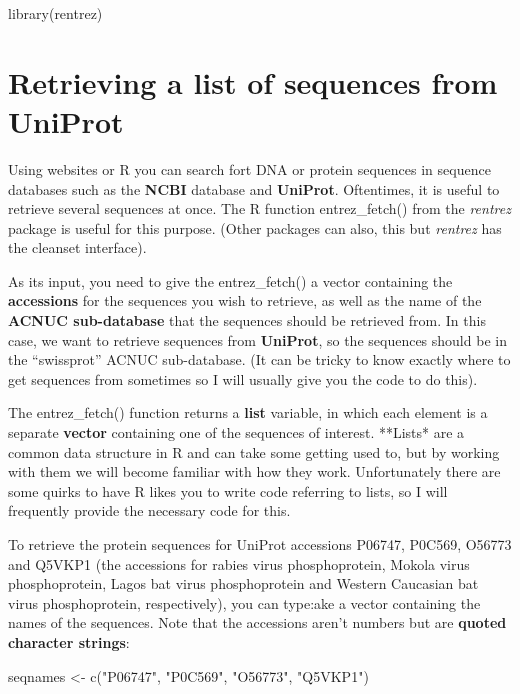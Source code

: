 \documentclass[
]{book}
\newenvironment{Shaded}{\begin{snugshade}}{\end{snugshade}}
\newcommand{\FunctionTok}[1]{\textcolor[rgb]{0.00,0.00,0.00}{#1}}
\newcommand{\NormalTok}[1]{#1}
\newcommand{\OtherTok}[1]{\textcolor[rgb]{0.56,0.35,0.01}{#1}}
\newcommand{\StringTok}[1]{\textcolor[rgb]{0.31,0.60,0.02}{#1}}
\begin{document}
\begin{Shaded}
\begin{Highlighting}[]
\FunctionTok{library}\NormalTok{(rentrez)}
\end{Highlighting}
\end{Shaded}

\hypertarget{retrieving-a-list-of-sequences-from-uniprot}{%
\section{Retrieving a list of sequences from UniProt}\label{retrieving-a-list-of-sequences-from-uniprot}}

Using websites or R you can search fort DNA or protein sequences in sequence databases such as the \textbf{NCBI} database and \textbf{UniProt}. Oftentimes, it is useful to retrieve several sequences at once. The R function entrez\_fetch() from the \emph{rentrez} package is useful for this purpose. (Other packages can also, this but \emph{rentrez} has the cleanset interface).

As its input, you need to give the entrez\_fetch() a vector containing the \textbf{accessions} for the sequences you wish to retrieve, as well as the name of the \textbf{ACNUC sub-database} that the sequences should be retrieved from. In this case, we want to retrieve sequences from \textbf{UniProt}, so the sequences should be in the ``swissprot'' ACNUC sub-database. (It can be tricky to know exactly where to get sequences from sometimes so I will usually give you the code to do this).

The entrez\_fetch() function returns a \textbf{list} variable, in which each element is a separate \textbf{vector} containing one of the sequences of interest. **Lists* are a common data structure in R and can take some getting used to, but by working with them we will become familiar with how they work. Unfortunately there are some quirks to have R likes you to write code referring to lists, so I will frequently provide the necessary code for this.

To retrieve the protein sequences for UniProt accessions P06747, P0C569, O56773 and Q5VKP1 (the accessions for rabies virus phosphoprotein, Mokola virus phosphoprotein, Lagos bat virus phosphoprotein and Western Caucasian bat virus phosphoprotein, respectively), you can type:ake a vector containing the names of the sequences. Note that the accessions aren't numbers but are \textbf{quoted character strings}:

\begin{Shaded}
\begin{Highlighting}[]
\NormalTok{seqnames }\OtherTok{\textless{}{-}} \FunctionTok{c}\NormalTok{(}\StringTok{"P06747"}\NormalTok{, }\StringTok{"P0C569"}\NormalTok{, }\StringTok{"O56773"}\NormalTok{, }\StringTok{"Q5VKP1"}\NormalTok{)  }
\end{Highlighting}
\end{Shaded}
\end{document}
